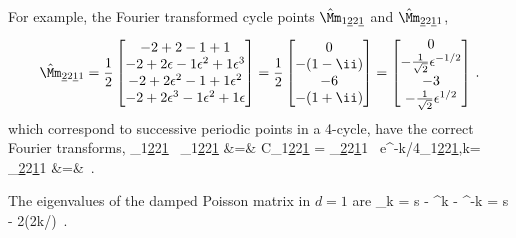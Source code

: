 For example, the Fourier transformed cycle points
$\hat{\Mm}_{1\underline{2}2\underline{1}}$ and
$\hat{\Mm}_{\underline{2}2\underline{1}1}$,
\[
\hat{\Mm}_{\underline{2}2\underline{1}1}=
\frac{1}{2}
\begin{bmatrix}
 -2 +2           -1           +1 \\
 -2 +2\epsilon   -1\epsilon^2 +1\epsilon^3 \\
 -2 +2\epsilon^2 -1           +1\epsilon^2 \\
 -2 +2\epsilon^3 -1\epsilon^2 +1\epsilon \\
\end{bmatrix}
=
\frac{1}{2}
\begin{bmatrix}
 0 \\
-(1 - \ii) \\
-6 \\
-(1 + \ii) \\
\end{bmatrix}
=
\begin{bmatrix}
 0 \\
-\frac{1}{\sqrt{2}}\epsilon^{-1/2} \\
-3 \\
-\frac{1}{\sqrt{2}}\epsilon^{1/2} \\
\end{bmatrix}
\,.
\]
which correspond to
successive periodic points in a 4-cycle,
have the correct Fourier
transforms,
\bea
{\Mm}_{1\underline{2}2\underline{1}}	\,\Rightarrow
\hat{\Mm}_{1\underline{2}2\underline{1}}
    &=&
	\continue
C{\Mm}_{1\underline{2}2\underline{1}}
= {\Mm}_{\underline{2}2\underline{1}1}
	\,\Rightarrow
e^{-\pi k/4}\hat{\Mm}_{1\underline{2}2\underline{1},k}=
\hat{\Mm}_{\underline{2}2\underline{1}1}
    &=&
\,.
\nnu %
\eea


The eigenvalues of the damped Poisson matrix
 in $d=1$
are
\beq
\lambda_k = s - \epsilon^k - \epsilon^{-k} = s - 2\cos \left(2\pi k/\speriod{}\right)
\,.

